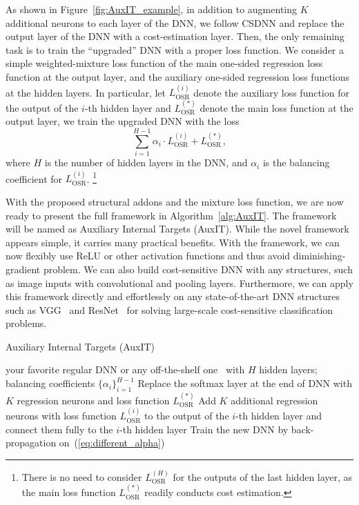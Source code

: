 \documentclass[a4paper]{article}
\begin{document}
  As shown in Figure~\ref{fig:AuxIT_example}, in addition to augmenting $K$ additional neurons to each layer of the DNN, we follow CSDNN and replace the output layer of the DNN with a cost-estimation layer.
  Then, the only remaining task is to train the ``upgraded'' DNN with a proper loss function. We consider a simple weighted-mixture loss function of the main one-sided regression loss function at the output layer, and the auxiliary one-sided regression loss functions at the hidden layers.
  In particular, let $L^{(i)}_{\mathrm{OSR}}$ denote the auxiliary loss function for the output of the $i$-th hidden layer and $L^{(*)}_{\mathrm{OSR}}$ denote the main loss function at the output layer, we train the upgraded DNN with the loss
  \begin{equation}
    \label{eq:different_alpha}
    \sum^{H - 1}_{i = 1}\alpha_{i} \cdot L^{(i)}_{\mathrm{OSR}} + L^{(*)}_{\mathrm{OSR}},
  \end{equation}
  where $H$ is the number of hidden layers in the DNN, and $\alpha_{i}$ is the balancing coefficient for $L^{(i)}_{\mathrm{OSR}}$.%
  \footnote{There is
    no need to consider $L^{(H)}_{\mathrm{OSR}}$ for the outputs of the last hidden layer, as the main loss function $L^{(*)}_{\mathrm{OSR}}$ readily conducts cost estimation.} 

  With the proposed structural addons and the mixture loss function, we are now ready to present the full framework in Algorithm~\ref{alg:AuxIT}. The framework will be named as Auxiliary Internal Targets (AuxIT).
  While the novel framework appears simple, it carries many practical benefits. 
  With the framework, we can now flexibly use ReLU or other activation functions and thus avoid diminishing-gradient problem. We can also build cost-sensitive DNN with any structures, such as image inputs with convolutional and pooling layers. Furthermore, we can apply this framework directly and effortlessly on 
  any state-of-the-art DNN structures such as VGG~\cite{simonyan2014very} and ResNet~\cite{he2015deep} for solving large-scale cost-sensitive classification problems.

  \begin{algorithm}[h]
    \caption{Auxiliary Internal Targets (AuxIT)}
    \label{alg:AuxIT}
    \begin{algorithmic}[1]
      \renewcommand{\algorithmicrequire}{\textbf{Input:}}
      \REQUIRE your favorite regular DNN or any off-the-shelf one~\cite{krizhevsky2012imagenet,simonyan2014very,szegedy2015going,he2015deep} with $H$ hidden layers; balancing coefficients $\{\alpha_{i}\} ^ {H - 1}_{i = 1}$
      \STATE Replace the softmax layer at the end of DNN with $K$ regression neurons and loss function $L^{(*)}_{\mathrm{OSR}}$
      \STATE Add $K$ additional regression neurons with loss function $L^{(i)}_{\mathrm{OSR}}$ to the output of the $i$-th hidden layer and connect them fully to the $i$-th hidden layer
      \ENDFOR
      \STATE Train the new DNN by back-propagation on~(\ref{eq:different_alpha})
    \end{algorithmic}
  \end{algorithm}
\end{document}

